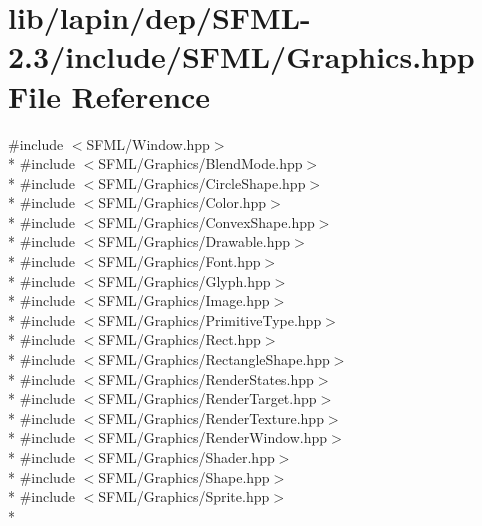 \hypertarget{lapin_2dep_2_s_f_m_l-2_83_2include_2_s_f_m_l_2_graphics_8hpp}{\section{lib/lapin/dep/\-S\-F\-M\-L-\/2.3/include/\-S\-F\-M\-L/\-Graphics.hpp File Reference}
\label{lapin_2dep_2_s_f_m_l-2_83_2include_2_s_f_m_l_2_graphics_8hpp}
}
{\ttfamily \#include $<$S\-F\-M\-L/\-Window.\-hpp$>$}\\*
{\ttfamily \#include $<$S\-F\-M\-L/\-Graphics/\-Blend\-Mode.\-hpp$>$}\\*
{\ttfamily \#include $<$S\-F\-M\-L/\-Graphics/\-Circle\-Shape.\-hpp$>$}\\*
{\ttfamily \#include $<$S\-F\-M\-L/\-Graphics/\-Color.\-hpp$>$}\\*
{\ttfamily \#include $<$S\-F\-M\-L/\-Graphics/\-Convex\-Shape.\-hpp$>$}\\*
{\ttfamily \#include $<$S\-F\-M\-L/\-Graphics/\-Drawable.\-hpp$>$}\\*
{\ttfamily \#include $<$S\-F\-M\-L/\-Graphics/\-Font.\-hpp$>$}\\*
{\ttfamily \#include $<$S\-F\-M\-L/\-Graphics/\-Glyph.\-hpp$>$}\\*
{\ttfamily \#include $<$S\-F\-M\-L/\-Graphics/\-Image.\-hpp$>$}\\*
{\ttfamily \#include $<$S\-F\-M\-L/\-Graphics/\-Primitive\-Type.\-hpp$>$}\\*
{\ttfamily \#include $<$S\-F\-M\-L/\-Graphics/\-Rect.\-hpp$>$}\\*
{\ttfamily \#include $<$S\-F\-M\-L/\-Graphics/\-Rectangle\-Shape.\-hpp$>$}\\*
{\ttfamily \#include $<$S\-F\-M\-L/\-Graphics/\-Render\-States.\-hpp$>$}\\*
{\ttfamily \#include $<$S\-F\-M\-L/\-Graphics/\-Render\-Target.\-hpp$>$}\\*
{\ttfamily \#include $<$S\-F\-M\-L/\-Graphics/\-Render\-Texture.\-hpp$>$}\\*
{\ttfamily \#include $<$S\-F\-M\-L/\-Graphics/\-Render\-Window.\-hpp$>$}\\*
{\ttfamily \#include $<$S\-F\-M\-L/\-Graphics/\-Shader.\-hpp$>$}\\*
{\ttfamily \#include $<$S\-F\-M\-L/\-Graphics/\-Shape.\-hpp$>$}\\*
{\ttfamily \#include $<$S\-F\-M\-L/\-Graphics/\-Sprite.\-hpp$>$}\\*
